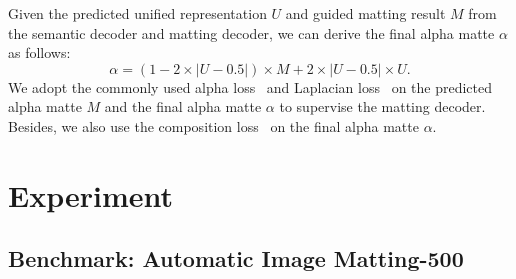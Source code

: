 \documentclass{article}
\begin{document}
Given the predicted unified representation $U$ and guided matting result $M$ from the semantic decoder and matting decoder, we can derive the final alpha matte $\alpha$ as follows:
\begin{equation}
\alpha = (1-2\times \left | U -0.5 \right | )\times M + 2\times \left | U -0.5 \right | \times U.
\label{equa:hardattention}
\end{equation}
We adopt the commonly used alpha loss~\cite{xu2017deep} and Laplacian loss~\cite{hou2019context} on the predicted alpha matte $M$ and the final alpha matte $\alpha$ to supervise the matting decoder. Besides, we also use the composition loss~\cite{xu2017deep} on the final alpha matte $\alpha$.

\section{Experiment}

\subsection{Benchmark: Automatic Image Matting-500}

\begin{table}[b]
\footnotesize

\caption{Comparison between AIM-500 with other matting test set.}
\label{tab:datasetcmoparison}
\end{table}
\end{document}
